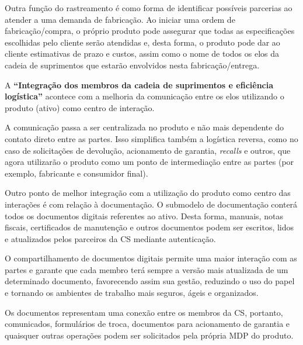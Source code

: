 Outra função do rastreamento é como forma de identificar possíveis parcerias ao atender a uma demanda de fabricação. Ao iniciar uma ordem de fabricação/compra, o próprio produto pode assegurar que todas as especificações escolhidas pelo cliente serão atendidas e, desta forma, o produto pode dar ao cliente estimativas de prazo e custos, assim como o nome de todos os elos da cadeia de suprimentos que estarão envolvidos nesta fabricação/entrega.

A \textbf{``Integração dos membros da cadeia de suprimentos e eficiência logística''} acontece com a melhoria da comunicação entre os elos utilizando o produto (ativo) como centro de interação.

A comunicação passa a ser centralizada no produto e não mais dependente do contato direto entre as partes. Isso simplifica também a logística reversa, como no caso de solicitações de devolução, acionamento de garantia, \textit{recalls} e outros, que agora utilizarão o produto como um ponto de intermediação entre as partes (por exemplo, fabricante e consumidor final).

Outro ponto de melhor integração com a utilização do produto como centro das interações é com relação à documentação. O submodelo de documentação conterá todos os documentos digitais referentes ao ativo. Desta forma, manuais, notas fiscais, certificados de manutenção e outros documentos podem ser escritos, lidos e atualizados pelos parceiros da CS mediante autenticação.

O compartilhamento de documentos digitais permite uma maior interação com as partes e garante que cada membro terá sempre a versão mais atualizada de um determinado documento, favorecendo assim sua gestão, reduzindo o uso do papel e tornando os ambientes de trabalho mais seguros, ágeis e organizados.

Os documentos representam uma conexão entre os membros da CS, portanto, comunicados, formulários de troca, documentos para acionamento de garantia e quaisquer outras operações podem ser solicitados pela própria MDP do produto.
